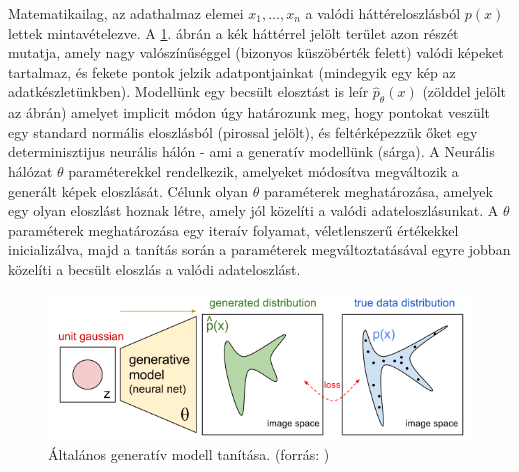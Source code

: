 Matematikailag, az adathalmaz elemei $x_1, \dots, x_n$ a valódi háttéreloszlásból $p(x)$ lettek mintavételezve. A \ref{fig:data_distribution}. ábrán a kék háttérrel jelölt terület azon részét mutatja, amely nagy valószínűséggel (bizonyos küszöbérték felett) valódi képeket tartalmaz, és fekete pontok jelzik adatpontjainkat (mindegyik egy kép az adatkészletünkben). Modellünk egy becsült elosztást is leír $\hat{p}_{\theta}(x)$ (zölddel jelölt az ábrán) amelyet implicit módon úgy határozunk meg, hogy pontokat veszült egy standard normális eloszlásból (pirossal jelölt), és feltérképezzük őket egy determinisztijus neurális hálón - ami a generatív modellünk (sárga). A Neurális hálózat $\theta$ paraméterekkel rendelkezik, amelyeket módosítva megváltozik a generált képek eloszlását. Célunk olyan $\theta$ paraméterek meghatározása, amelyek egy olyan eloszlást hoznak létre, amely jól közelíti a valódi adateloszlásunkat. A $\theta$ paraméterek meghatározása egy iteraív folyamat, véletlenszerű értékekkel inicializálva, majd a tanítás során a paraméterek megváltoztatásával egyre jobban közelíti a becsült eloszlás a valódi adateloszlást.

\begin{figure}[ht]
	\centering
	\includegraphics[width=1\columnwidth]{figures/generative_model_math.png}
	\caption{Általános generatív modell tanítása. (forrás: \cite{fig:generative_model_math})}
	\label{fig:data_distribution}
\end{figure}


